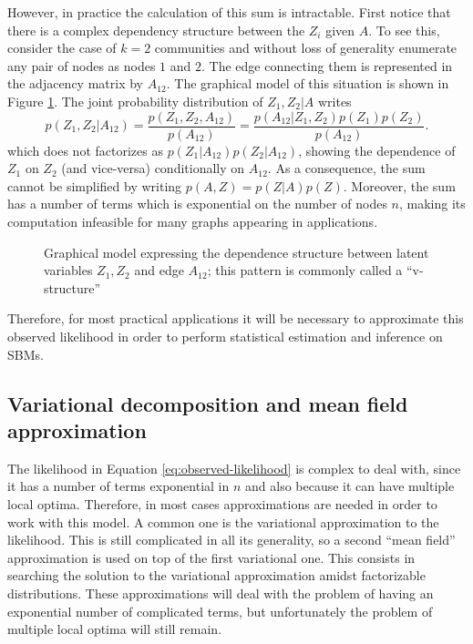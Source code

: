 \documentclass[../../main.tex]{subfiles} %
\begin{document}
However, in practice the calculation of this sum is intractable. First 
notice that 
there is a complex dependency structure between the \(Z_i\) given 
\(A\). To see 
this, consider the case of \(k = 2\) communities and without loss of 
generality 
enumerate any pair of nodes as nodes \(1\) and \(2\). The edge 
connecting 
them is represented in the adjacency matrix by \(A_{12}\). The 
graphical model 
of this situation is shown in Figure \ref{fig:v-structure}. The joint 
probability 
distribution of \(Z_1, Z_2 \vert A\) writes
\begin{equation}
	p(Z_1, Z_2 \vert A_{12}) = \frac{p(Z_1, Z_2, A_{12})}{p(A_{12})} = 
	\frac{p(A_{12} \vert Z_1, Z_2) p(Z_1) p(Z_2)}{p(A_{12})}.
	\label{eq:dependence-structure}
\end{equation}
which does not factorizes as \(p(Z_1 \vert A_{12}) p(Z_2 \vert 
A_{12})\), 
showing the dependence of \(Z_1\) on \(Z_2\) (and vice-versa) 
conditionally on 
\(A_{12}\). As a consequence, the sum cannot be simplified by 
writing \(p(A, Z) 
= p(Z \vert A) p(Z)\). Moreover, the sum has a number of terms 
which is exponential on the number of nodes \(n\), making its computation 
infeasible for many graphs appearing in applications.
\begin{figure}
	\centering
	
	\caption{Graphical model expressing the dependence structure 
	between 
	latent variables \(Z_1, Z_2\) and edge \(A_{12}\); this pattern is 
	commonly 
	called a ``v-structure'' \cite{koller2009probabilistic}}
	\label{fig:v-structure}
\end{figure}

Therefore, for most practical applications it will be necessary to approximate 
this observed likelihood in order to perform statistical estimation and 
inference on SBMs.

\subsection{Variational decomposition and mean field approximation}
The likelihood in Equation \eqref{eq:observed-likelihood} is complex to deal 
with, since it has a number of terms exponential in \(n\) and also because it 
can have multiple local optima. Therefore, in most cases approximations are 
needed in order to work with this model. A common one is the variational 
approximation to the likelihood. This is still complicated in all its generality, 
so a second ``mean field'' approximation is used on top of the first 
variational one. This consists in searching the solution to the variational 
approximation amidst factorizable distributions. These approximations will 
deal with the problem of having an exponential number of complicated 
terms, but unfortunately the problem of multiple local optima will still 
remain.
\end{document}
